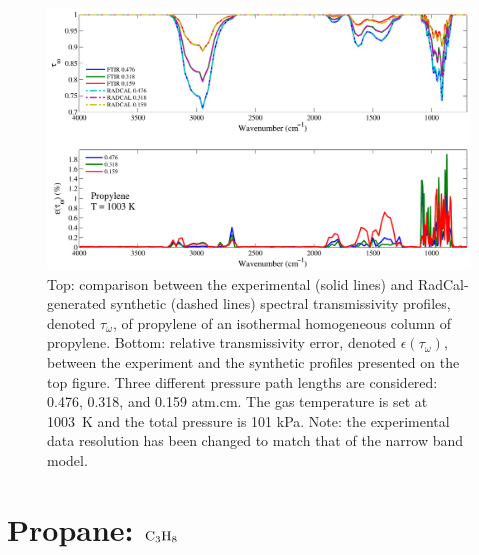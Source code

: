 \begin{figure}[p]
\includegraphics[width=\textwidth]{../Verification/Results_Test2/Propylene_1003.pdf}
\caption{Top: comparison between the experimental (solid lines) and RadCal-generated synthetic (dashed lines) spectral transmissivity profiles, denoted $\tau_{\omega}$, of propylene of an isothermal homogeneous column of propylene. Bottom: relative transmissivity error, denoted $\epsilon{(\tau_{\omega})}$, between the experiment and the synthetic profiles presented on the top figure. Three different pressure path lengths are considered: 0.476, 0.318, and 0.159 atm.cm. The gas temperature is set at 1003~K and the total pressure is 101 kPa. Note: the experimental data resolution has been changed to match that of the narrow band model. \label{fig:propylene_Verify_1003K}}
\end{figure}


\clearpage

\section{Propane: $\rm C_3H_8$}

